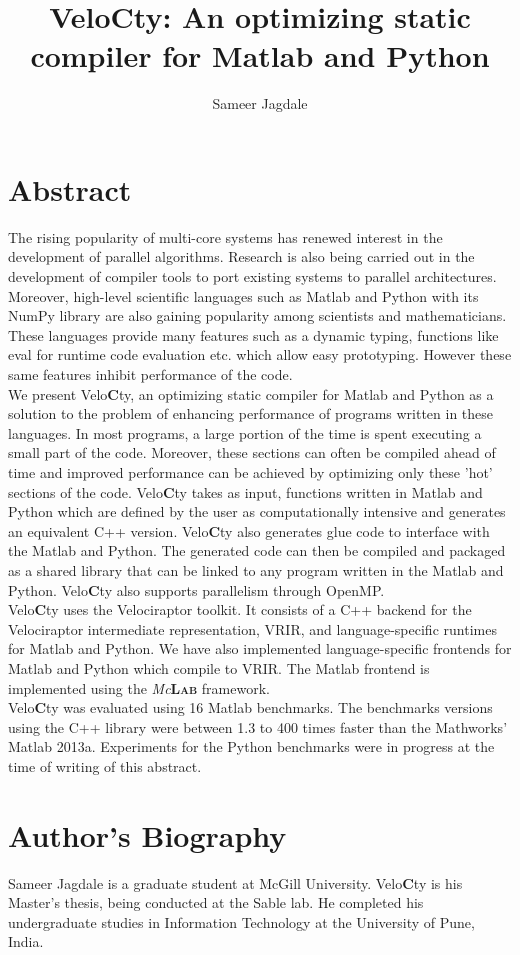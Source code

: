 \documentclass[a4paper, 12pt]{article}
\newcommand{\matlab}{{\textsc Matlab}\xspace}
\newcommand{\velocty}{{Velo\textbf{C}ty}\xspace}
\newcommand{\smclab}{\textrm{\textsl{Mc}\textbf{\textsc{Lab}}}}
\newcommand{\mclab}{\smclab\xspace}
\begin{document}
\title{\velocty : An optimizing static compiler for \matlab and Python}
\author[1]{Sameer Jagdale}
\maketitle
\section*{Abstract}
The rising popularity of multi-core systems has renewed interest in the development of parallel algorithms. Research is also being carried out in the development of compiler tools to port existing systems to parallel architectures. Moreover, high-level scientific languages such as \matlab and Python with its NumPy library are also gaining popularity among scientists and mathematicians. These languages provide many features such as a dynamic typing, functions like eval for runtime code evaluation etc. which allow easy prototyping. However these same features inhibit performance of the code. \\ 
We present \velocty, an optimizing static compiler for \matlab and Python as a solution to the problem of enhancing performance of programs written in these languages. In most programs, a large portion of the time is spent executing a small part of the code. Moreover, these sections can often be compiled ahead of time and improved performance can be achieved by optimizing only these 'hot' sections of the code. \velocty takes as input, functions written in \matlab and Python which are defined by the user as computationally intensive and generates an equivalent C++ version. \velocty also generates glue code to interface with the \matlab and Python. The generated code can then be compiled and packaged as a shared library that can be linked to any program written in the \matlab and Python. \velocty also supports parallelism through OpenMP.\\
\velocty uses the Velociraptor toolkit. It consists of a C++ backend for the Velociraptor intermediate representation, VRIR, and language-specific runtimes for \matlab and Python. We have also implemented language-specific frontends for \matlab and Python which compile to VRIR. The \matlab frontend is implemented using the \mclab framework. \\
\velocty was evaluated using 16 \matlab benchmarks. The benchmarks versions using the C++ library were between 1.3 to 400 times faster than the Mathworks' \matlab2013a. Experiments for the Python benchmarks were in progress at the time of writing of this abstract.
\section*{Author's Biography}
Sameer Jagdale is a graduate student at McGill University. \velocty is his Master's thesis, being conducted at the Sable lab. He completed his undergraduate studies in Information Technology at the University of Pune, India.
\end{document}
